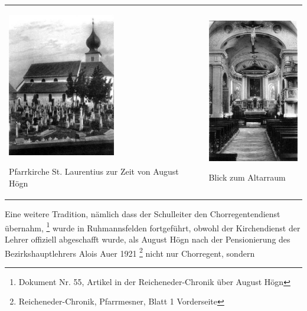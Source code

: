 \begin{center}
\begin{minipage}{9.491cm}
\begin{flushleft}
\tablefirsthead{}
\tablehead{}
\tabletail{}
\tablelasttail{}
\begin{supertabular}{m{4.8960004cm}m{4.196cm}}

\includegraphics[width=4.713cm,height=6.301cm]{pictures/zulassungsarbeit-img025.jpg}

Pfarrkirche St. Laurentius zur Zeit von
August Högn &

\includegraphics[width=4.013cm,height=6.292cm]{pictures/zulassungsarbeit-img026.jpg}

Blick zum Altarraum\\
\end{supertabular}
\end{flushleft}
\end{minipage}
\end{center}
Eine weitere Tradition, nämlich dass der Schulleiter den
Chorregentendienst übernahm, \footnote{Dokument Nr. 55, Artikel in der
Reicheneder-Chronik über August Högn} wurde in Ruhmannsfelden
fortgeführt, obwohl der Kirchendienst der Lehrer offiziell abgeschafft
wurde, als August Högn nach der Pensionierung des Bezirkshauptlehrers
Alois Auer 1921 \footnote{Reicheneder-Chronik, Pfarrmesner, Blatt 1
Vorderseite} nicht nur Chorregent, sondern
